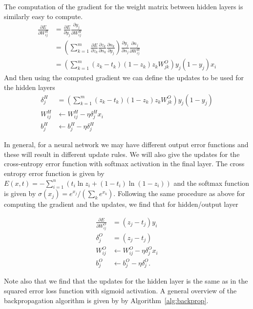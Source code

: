 \documentclass[conference]{IEEEtran}
\begin{document}
The computation of the gradient for the weight matrix between hidden layers is similarly easy to compute.
\begin{equation}
\begin{split}
\frac{\partial E}{\partial W^H_{ij}} &= \frac{\partial E}{\partial y_j}\frac{\partial y_j}{\partial W^H_{ij}} \\
&=\left(\sum_{k=1}^m \frac{\partial E}{\partial z_k}\frac{\partial z_k}{\partial n_k}\frac{\partial n_k}{\partial y_j} \right)\frac{\partial y_j}{\partial n_j}\frac{\partial n_j}{\partial W_{ij}^H}\\
																	 &=\left(\sum_{k=1}^m (z_k - t_k)(1-z_k)z_kW_{jk}^O \right)y_j(1-y_j)x_i
\end{split}
\label{}
\end{equation}
And then using the computed gradient we can define the updates to be used for the hidden layers
\begin{equation}
\begin{split}
\delta^H_j &= \left(\sum_{k=1}^m (z_k - t_k)(1-z_k)z_kW_{jk}^O \right)y_j(1-y_j) \\
W^H_{ij} &\leftarrow W^H_{ij} - \eta\delta^H_jx_i \\
b^H_j &\leftarrow b^H_j - \eta\delta^H_j
\end{split}
\end{equation}

In general, for a neural network we may have different output error functions and these will result in different update rules. We will also give the updates
for the cross-entropy error function with softmax activation in the final layer.
The cross entropy error function is given by $E(x,t) = -\sum_{i=1}^n \left(t_i\ln z_i + (1-t_i)\ln(1-z_i)\right)$
and the softmax function is given by $\sigma(x_j) = e^{x_j} /(\sum_k e^{x_k})$. Following the same procedure as above
for computing the gradient and the updates, we find that for hidden/output layer

\begin{equation}
\begin{split}
\frac{\partial E}{\partial W^O_{ij}} &= (z_j - t_j)y_i \\
\delta^O_j &= (z_j-t_j) \\
W^O_{ij} &\leftarrow W^O_{ij} - \eta \delta^O_j x_i \\
b^O_j &\leftarrow b^O_j - \eta\delta^O_j.
\end{split}
\end{equation}

Note also that we find that the updates for the hidden layer is the same as in the squared error loss function with sigmoid activation. A general overview of the backpropagation algorithm is given by by Algorithm~\ref{alg:backprop}.
\end{document}
